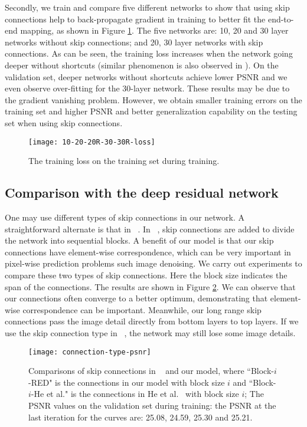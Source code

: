 Secondly, we train and compare five different networks to show that using skip
connections help to back-propagate gradient in training to better fit the end-to-end
mapping, as shown in Figure \ref{fig6}. The five networks are: 10, 20 and 30 layer
networks without skip connections;  and 20, 30 layer networks with skip connections.
As  can be seen, the training loss increases when the network going deeper without
shortcuts (similar phenomenon is also observed in \cite{DBLP:journals/corr/HeZRS15}).
On the validation set, deeper networks without shortcuts achieve lower PSNR and we
even observe over-fitting for the 30-layer network. These results may be due to  the
gradient vanishing problem. However, we obtain smaller training errors on the training set and
higher PSNR and better generalization capability on the testing set when using skip connections.


\begin{figure}[b!]
\centering
\texttt{[image: 10-20-20R-30-30R-loss]}
\caption{The training loss on the training set during training.}
\label{fig6}
\end{figure}



\subsection{Comparison with the deep residual network \cite{DBLP:journals/corr/HeZRS15}}

One may use different types of skip connections in our network. A straightforward
alternate is that in ~\cite{DBLP:journals/corr/HeZRS15}. In ~\cite{DBLP:journals/corr/HeZRS15},
 skip connections are added to divide the network into sequential blocks. A benefit
of our model is that our skip connections have element-wise correspondence, which can be
very important in pixel-wise prediction problems such image denoising. We carry out
experiments to compare these two types of skip connections. Here the block size indicates
the span of the connections. The results are shown in Figure \ref{fig8}. We can observe
that our connections often converge to a better optimum, demonstrating that element-wise
correspondence can be important. Meanwhile, our long range skip connections pass the image
detail directly from bottom layers to top layers. If we use the skip connection type in
~\cite{DBLP:journals/corr/HeZRS15}, the network may still lose some image details.


\begin{figure}[t!]
\centering
\texttt{[image: connection-type-psnr]}
\caption{Comparisons of skip connections in ~\cite{DBLP:journals/corr/HeZRS15} and our
model, where ``Block-$i$-RED" is the connections in our model with block size $i$ and
``Block-$i$-He et al." is the connections in He et al.~\cite{DBLP:journals/corr/HeZRS15}
with block size $i$; The PSNR values on the validation set during training: the PSNR at
the last iteration for the curves are: 25.08, 24.59, 25.30 and 25.21.}
\label{fig8}
\end{figure}


